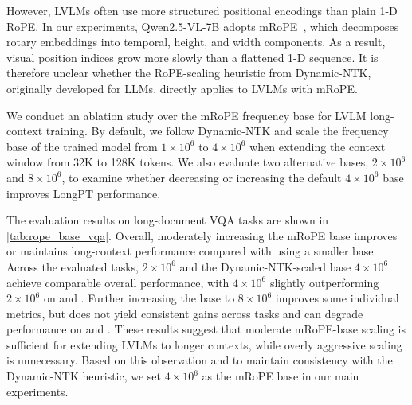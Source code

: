 {{{{However, LVLMs often use more structured positional encodings than plain 1-D RoPE.
In our experiments, Qwen2.5-VL-7B adopts mRoPE~\citep{wang2024qwen2}, which decomposes rotary embeddings into temporal, height, and width components.
As a result, visual position indices grow more slowly than a flattened 1-D sequence.
It is therefore unclear whether the RoPE-scaling heuristic from Dynamic-NTK, originally developed for LLMs, directly applies to LVLMs with mRoPE.

We conduct an ablation study over the mRoPE frequency base for LVLM long-context training.
By default, we follow Dynamic-NTK and scale the frequency base of the trained model from $1\times 10^6$ to $4\times 10^6$ when extending the context window from 32K to 128K tokens.
We also evaluate two alternative bases, $2\times 10^6$ and $8\times 10^6$, to examine whether decreasing or increasing the default $4\times 10^6$ base improves LongPT performance.

The evaluation results on long-document VQA tasks are shown in \cref{tab:rope_base_vqa}.
Overall, moderately increasing the mRoPE base improves or maintains long-context performance compared with using a smaller base.
Across the evaluated tasks, $2\times 10^6$ and the Dynamic-NTK-scaled base $4\times 10^6$ achieve comparable overall performance, with $4\times 10^6$ slightly outperforming $2\times 10^6$ on \extractmulti and \reasoningtask.
Further increasing the base to $8\times 10^6$ improves some individual metrics, but does not yield consistent gains across tasks and can degrade performance on \extractmulti and \reasoningtask.
These results suggest that moderate mRoPE-base scaling is sufficient for extending LVLMs to longer contexts, while overly aggressive scaling is unnecessary.
Based on this observation and to maintain consistency with the Dynamic-NTK heuristic, we set $4\times 10^6$ as the mRoPE base in our main experiments.

}}}}
